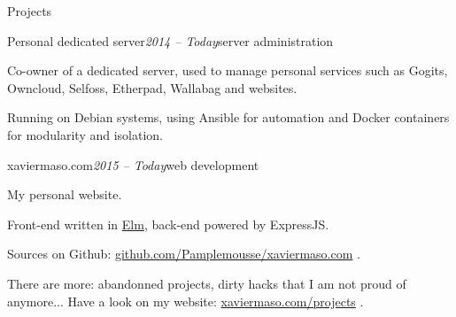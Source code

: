 \begin{rSection}{Projects}

  \begin{rSubsection}{Personal dedicated server}{\em 2014 -- Today}{server administration}{}
    \item[] Co-owner of a dedicated server, used to manage personal services such as Gogits, Owncloud, Selfoss, Etherpad, Wallabag and websites.
    \item Running on Debian systems, using Ansible for automation and Docker containers for modularity and isolation.
  \end{rSubsection}

  \begin{rSubsection}{xaviermaso.com}{\em 2015 -- Today}{web development}{}
    \item[] My personal website.
    \item Front-end written in \href{http://elm-lang.org/}{Elm}, back-end powered by ExpressJS.
    \item Sources on Github: \href{https://github.com/Pamplemousse/xaviermaso.com}{github.com/Pamplemousse/xaviermaso.com} .
  \end{rSubsection}

  \begin{rSubsection}{}{}{}{}
  \item[] There are more: abandonned projects, dirty hacks that I am not proud of anymore... Have a look on my website: \href{http://xaviermaso.com/projects}{xaviermaso.com/projects} .
  \end{rSubsection}

\end{rSection}

